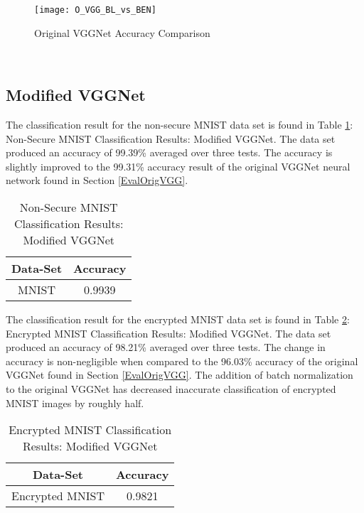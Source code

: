 \documentclass[12pt, titlepage]{article}
\begin{document}
\begin{figure}[h!]
	\begin{center}
		\texttt{[image: O\_VGG\_BL\_vs\_BEN]}
		\caption{Original VGGNet Accuracy Comparison}
		\label{GRAPH_OriginalVGG}
	\end{center}
\end{figure} 

~\newpage
\subsection{Modified VGGNet}\label{EvalModVGG}

The classification result for the non-secure MNIST data set is found in Table \ref{table:modVGG_MNIST}: Non-Secure MNIST Classification Results: Modified VGGNet. The data set produced an accuracy of 99.39\% averaged over three tests. The accuracy is slightly improved to the 99.31\% accuracy result of the original VGGNet neural network found in Section \ref{EvalOrigVGG}.\\ 

\begin{table}[!h]
	\begin{center}
		\begin{tabular}{| c | c |}
			\hline
			\textbf{Data-Set} & \textbf{Accuracy}\\
			\hline
			MNIST & 0.9939\\
			\hline
		\end{tabular}
		\caption{Non-Secure MNIST Classification Results: Modified VGGNet}
		\label{table:modVGG_MNIST}
	\end{center}
\end{table}

\noindent The classification result for the encrypted MNIST data set is found in Table \ref{table:modVGG_Encryption}: Encrypted MNIST Classification Results: Modified VGGNet. The data set produced an accuracy of 98.21\% averaged over three tests. The change in accuracy is non-negligible when compared to the 96.03\% accuracy of the original VGGNet found in Section \ref{EvalOrigVGG}. The addition of batch normalization to the original VGGNet has decreased inaccurate classification of encrypted MNIST images by roughly half.\\

\begin{table}[!h]
	\begin{center}
		\begin{tabular}{| c | c |}
			\hline
			\textbf{Data-Set} & \textbf{Accuracy}\\
			\hline
			Encrypted MNIST & 0.9821\\
			\hline
		\end{tabular}
		\caption{Encrypted MNIST Classification Results: Modified VGGNet}
		\label{table:modVGG_Encryption}
	\end{center}
\end{table}
\end{document}

